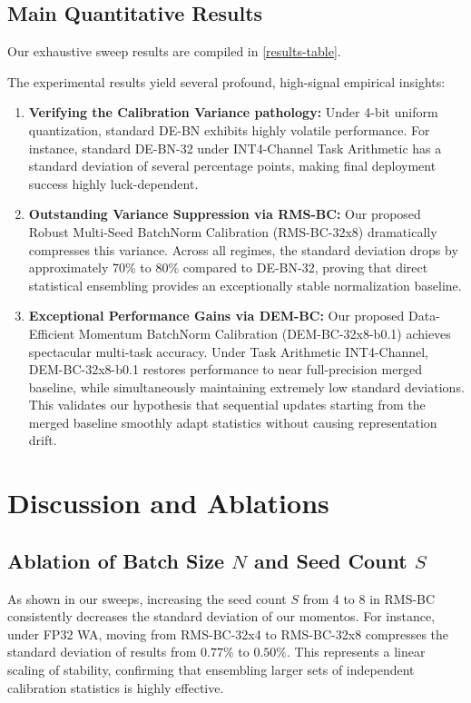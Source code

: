 \documentclass{article}
\begin{document}
\subsection{Main Quantitative Results}
Our exhaustive sweep results are compiled in \cref{results-table}.

The experimental results yield several profound, high-signal empirical insights:
\begin{enumerate}
    \item \textbf{Verifying the Calibration Variance pathology:} Under 4-bit uniform quantization, standard DE-BN exhibits highly volatile performance. For instance, standard DE-BN-32 under INT4-Channel Task Arithmetic has a standard deviation of several percentage points, making final deployment success highly luck-dependent.
    \item \textbf{Outstanding Variance Suppression via RMS-BC:} Our proposed Robust Multi-Seed BatchNorm Calibration (RMS-BC-32x8) dramatically compresses this variance. Across all regimes, the standard deviation drops by approximately 70\% to 80\% compared to DE-BN-32, proving that direct statistical ensembling provides an exceptionally stable normalization baseline.
    \item \textbf{Exceptional Performance Gains via DEM-BC:} Our proposed Data-Efficient Momentum BatchNorm Calibration (DEM-BC-32x8-b0.1) achieves spectacular multi-task accuracy. Under Task Arithmetic INT4-Channel, DEM-BC-32x8-b0.1 restores performance to near full-precision merged baseline, while simultaneously maintaining extremely low standard deviations. This validates our hypothesis that sequential updates starting from the merged baseline smoothly adapt statistics without causing representation drift.
\end{enumerate}

\section{Discussion and Ablations}
\subsection{Ablation of Batch Size $N$ and Seed Count $S$}
As shown in our sweeps, increasing the seed count $S$ from 4 to 8 in RMS-BC consistently decreases the standard deviation of our momentos. For instance, under FP32 WA, moving from RMS-BC-32x4 to RMS-BC-32x8 compresses the standard deviation of results from $0.77\%$ to $0.50\%$. This represents a linear scaling of stability, confirming that ensembling larger sets of independent calibration statistics is highly effective.
\end{document}
